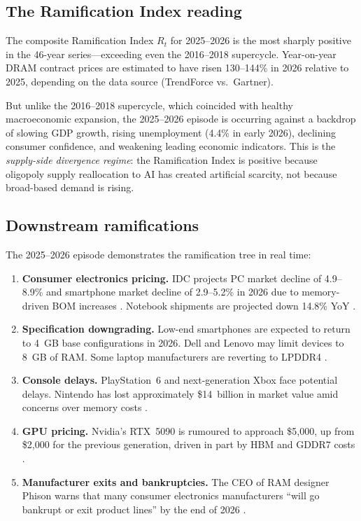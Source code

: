 \documentclass[12pt]{article}
\theoremstyle{definition}
\begin{document}
\subsection{The Ramification Index reading}

The composite Ramification Index $R_t$ for 2025--2026 is the most sharply positive in the 46-year series---exceeding even the 2016--2018 supercycle. Year-on-year DRAM contract prices are estimated to have risen 130--144\% in 2026 relative to 2025, depending on the data source (TrendForce vs.\ Gartner).

But unlike the 2016--2018 supercycle, which coincided with healthy macroeconomic expansion, the 2025--2026 episode is occurring against a backdrop of slowing GDP growth, rising unemployment (4.4\% in early 2026), declining consumer confidence, and weakening leading economic indicators. This is the \emph{supply-side divergence regime}: the Ramification Index is positive because oligopoly supply reallocation to AI has created artificial scarcity, not because broad-based demand is rising.

\subsection{Downstream ramifications}

The 2025--2026 episode demonstrates the ramification tree in real time:

\begin{enumerate}[itemsep=4pt]
\item \textbf{Consumer electronics pricing.} IDC projects PC market decline of 4.9--8.9\% and smartphone market decline of 2.9--5.2\% in 2026 due to memory-driven BOM increases \cite{ColdFusion2026}. Notebook shipments are projected down 14.8\% YoY \cite{TrendForce2026Q2}.

\item \textbf{Specification downgrading.} Low-end smartphones are expected to return to 4~GB base configurations in 2026. Dell and Lenovo may limit devices to 8~GB of RAM. Some laptop manufacturers are reverting to LPDDR4 \cite{TrendForce2025Dec_consumer}.

\item \textbf{Console delays.} PlayStation~6 and next-generation Xbox face potential delays. Nintendo has lost approximately \$14~billion in market value amid concerns over memory costs \cite{ColdFusion2026}.

\item \textbf{GPU pricing.} Nvidia's RTX~5090 is rumoured to approach \$5,000, up from \$2,000 for the previous generation, driven in part by HBM and GDDR7 costs \cite{ColdFusion2026}.

\item \textbf{Manufacturer exits and bankruptcies.} The CEO of RAM designer Phison warns that many consumer electronics manufacturers ``will go bankrupt or exit product lines'' by the end of 2026 \cite{ColdFusion2026}.
\end{enumerate}
\end{document}
